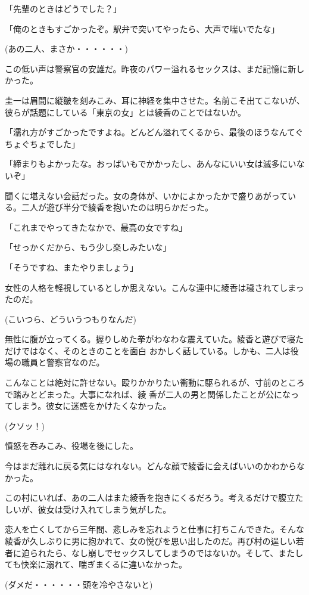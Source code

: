 ﻿\documentclass[book,tate]{jlreq}
\begin{document}
「先輩のときはどうでした？」

「俺のときもすごかったぞ。駅弁で突いてやったら、大声で喘いでたな」

(あの二人、まさか・・・・・・)

この低い声は警察官の安雄だ。昨夜のパワー溢れるセックスは、まだ記憶に新しかった。

圭一は眉間に縦皺を刻みこみ、耳に神経を集中させた。名前こそ出てこないが、彼らが話題にしている「東京の女」とは綾香のことではないか。

「濡れ方がすごかったですよね。どんどん溢れてくるから、最後のほうなんてぐちょぐちょでした」

「締まりもよかったな。おっぱいもでかかったし、あんなにいい女は滅多にいないぞ」

聞くに堪えない会話だった。女の身体が、いかによかったかで盛りあがっている。二人が遊び半分で綾香を抱いたのは明らかだった。

「これまでやってきたなかで、最高の女ですね」

「せっかくだから、もう少し楽しみたいな」

「そうですね、またやりましょう」

女性の人格を軽視しているとしか思えない。こんな連中に綾香は穢されてしまったのだ。

(こいつら、どういうつもりなんだ)

無性に腹が立ってくる。握りしめた拳がわなわな震えていた。綾香と遊びで寝ただけではなく、そのときのことを面白 おかしく話している。しかも、二人は役場の職員と警察官なのだ。

こんなことは絶対に許せない。殴りかかりたい衝動に駆られるが、寸前のところで踏みとどまった。大事になれば、綾 香が二人の男と関係したことが公になってしまう。彼女に迷惑をかけたくなかった。

(クソッ！)

憤怒を呑みこみ、役場を後にした。

今はまだ離れに戻る気にはなれない。どんな顔で綾香に会えばいいのかわからなかった。

この村にいれば、あの二人はまた綾香を抱きにくるだろう。考えるだけで腹立たしいが、彼女は受け入れてしまう気がした。

恋人を亡くしてから三年間、悲しみを忘れようと仕事に打ちこんできた。そんな綾香が久しぶりに男に抱かれて、女の悦びを思い出したのだ。再び村の逞しい若者に迫られたら、なし崩しでセックスしてしまうのではないか。そして、またしても快楽に溺れて、喘ぎまくるに違いなかった。

(ダメだ・・・・・・頭を冷やさないと)
\end{document}
